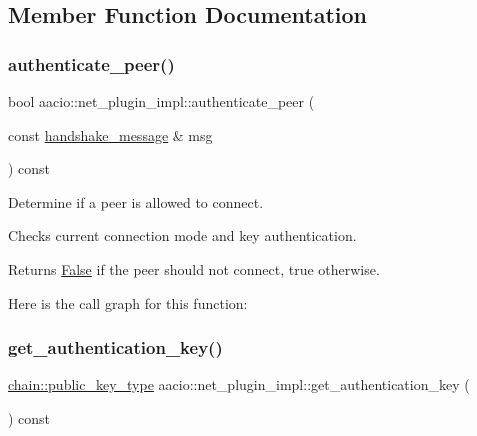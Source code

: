 \subsection{Member Function Documentation}
\mbox{\label{classaacio_1_1net__plugin__impl_a4f282701a98cbb4ea2f945b1a1bf1d3c}} 
\subsubsection{\texorpdfstring{authenticate\+\_\+peer()}{authenticate\_peer()}}
{\footnotesize\ttfamily bool aacio\+::net\+\_\+plugin\+\_\+impl\+::authenticate\+\_\+peer (\begin{DoxyParamCaption}\item[{const \mbox{\hyperlink{structaacio_1_1handshake__message}{handshake\+\_\+message}} \&}]{msg }\end{DoxyParamCaption}) const}



Determine if a peer is allowed to connect. 

Checks current connection mode and key authentication.

\begin{DoxyReturn}{Returns}
\mbox{\hyperlink{struct_false}{False}} if the peer should not connect, true otherwise. 
\end{DoxyReturn}
Here is the call graph for this function\+:
\mbox{\label{classaacio_1_1net__plugin__impl_ae0c80b9cd48e8885b2366eae880dd285}} 
\subsubsection{\texorpdfstring{get\+\_\+authentication\+\_\+key()}{get\_authentication\_key()}}
{\footnotesize\ttfamily \mbox{\hyperlink{classfc_1_1crypto_1_1public__key}{chain\+::public\+\_\+key\+\_\+type}} aacio\+::net\+\_\+plugin\+\_\+impl\+::get\+\_\+authentication\+\_\+key (\begin{DoxyParamCaption}{ }\end{DoxyParamCaption}) const}



